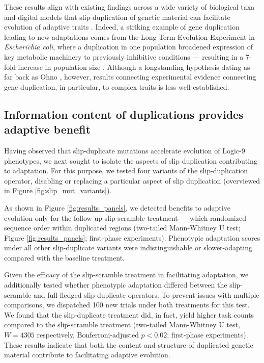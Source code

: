 These results align with existing findings across a wide variety of biological taxa and digital models that slip-duplication of genetic material can facilitate evolution of adaptive traits \citep{Koza:1995fr,Zhang:2003fw,Teichmann:2004cz}.
Indeed, a striking example of gene duplication leading to new adaptations comes from the Long-Term Evolution Experiment in \textit{Escherichia coli}, where a duplication in one population broadened expression of key metabolic machinery to previously inhibitive conditions --- resulting in a 7-fold increase in population size \citep{blount_genomic_2012}.
Although a longstanding hypothesis dating as far back as Ohno \citep{ohno1970evolution}, however, results connecting experimental evidence connecting gene duplication, in particular, to complex traits is less well-established.

\subsection{Information content of duplications provides adaptive benefit}



Having observed that slip-duplicate mutations accelerate evolution of Logic-9 phenotypes, we next sought to isolate the aspects of slip duplication contributing to adaptation.
For this purpose, we tested four variants of the slip-duplication operator, disabling or replacing a particular aspect of slip duplication (overviewed in Figure \ref{fig:slip_mut_variants}).

As shown in Figure \ref{fig:results_panels}, we detected benefits to adaptive evolution only for the follow-up slip-scramble treatment --- which randomized sequence order within duplicated regions (two-tailed Mann-Whitney U test; Figure \ref{fig:results_panels}; first-phase experiments).
Phenotypic adaptation scores under all other slip-duplicate variants were indistinguishable or slower-adapting compared with the baseline treatment.

Given the efficacy of the slip-scramble treatment in facilitating adaptation, we additionally tested whether phenotypic adaptation differed between the slip-scramble and full-fledged slip-duplicate operators.
To prevent issues with multiple comparisons, we dispatched 100 new trials under both treatments for this test.
We found that the slip-duplicate treatment did, in fact, yield higher task counts compared to the slip-scramble treatment (two-tailed Mann-Whitney U test, $W = 4305$ respectively, Bonferroni-adjusted $p < 0.02$; first-phase experiments).
These results indicate that both the content and structure of duplicated genetic material contribute to facilitating adaptive evolution.

